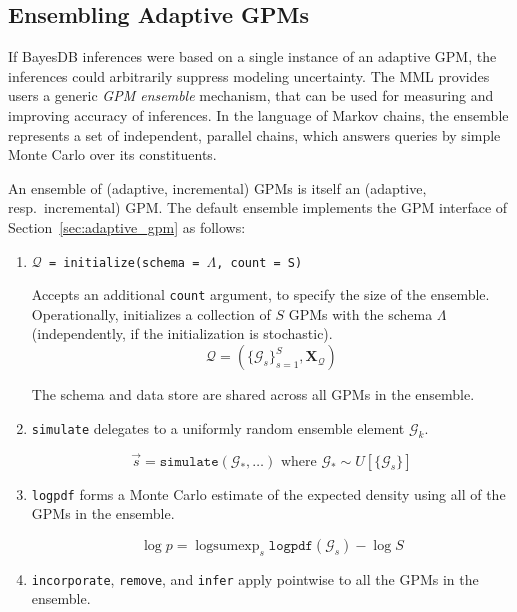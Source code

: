 \documentclass[10pt,letterpaper]{article}
\DeclareMathOperator{\logsumexp}{logsumexp}
\newcommand{\set}[1]{\{#1\}}
\newcommand{\G}{\mathcal{G}}
\begin{document}
\subsection{Ensembling Adaptive GPMs}
\label{sec:ensemble}

If BayesDB inferences were based on a single instance of an adaptive
GPM, the inferences could arbitrarily suppress modeling
uncertainty. The MML provides users a generic \emph{GPM ensemble}
mechanism, that can be used for measuring and improving accuracy of
inferences.  In the language of Markov chains, the ensemble represents
a set of independent, parallel chains, which answers queries by simple
Monte Carlo over its constituents.

An ensemble of (adaptive, incremental) GPMs is itself an (adaptive,
resp.\ incremental) GPM.  The default ensemble implements the GPM interface of
Section~\ref{sec:adaptive_gpm}
as follows:

\begin{enumerate}
\item \texttt{$\mathcal{Q}$ = initialize(schema = $\Lambda$, count = S)}

    Accepts an additional \texttt{count} argument, to specify the size
    of the ensemble.  Operationally, initializes a collection of $S$
    GPMs with the schema $\Lambda$ (independently, if the
    initialization is stochastic).
    $$
    \mathcal{Q} = (\set{\G_s}_{s=1}^S, \mathbf{X_\mathcal{Q}})
    $$

    The schema and data store are shared across all GPMs in the
    ensemble.

\item \texttt{simulate} delegates to a uniformly random ensemble
  element $\G_k$.

    $$
    \vec{s} = \texttt{simulate} (\G_*,\dots) \text{ where }
    \G_* \sim U[\set{\G_s}]
    $$


\item \texttt{logpdf} forms a Monte Carlo estimate of the expected density using
all of the GPMs in the ensemble.

    $$
    \log p = \logsumexp_s\texttt{logpdf}(\G_s) - \log S
    $$

\item \texttt{incorporate}, \texttt{remove}, and \texttt{infer} apply
  pointwise to all the GPMs in the ensemble.

\end{enumerate}
\end{document}
